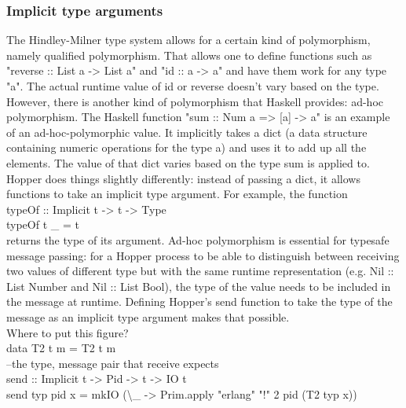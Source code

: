 \subsubsection{Implicit type arguments}
The Hindley-Milner type system allows for a certain kind of polymorphism, namely qualified polymorphism. That allows one to define functions such as "reverse :: List a -> List a" and "id :: a -> a" and have them work for any type "a". The actual runtime value of id or reverse doesn't vary based on the type. However, there is another kind of polymorphism that Haskell provides: ad-hoc polymorphism. The Haskell function "sum :: Num a => [a] -> a" is an example of an ad-hoc-polymorphic value. It implicitly takes a dict (a data structure containing numeric operations for the type a) and uses it to add up all the elements. The value of that dict varies based on the type sum is applied to. Hopper does things slightly differently: instead of passing a dict, it allows functions to take an implicit type argument. For example, the function \\
typeOf :: Implicit t -> t -> Type \\
typeOf t \_ = t \\
returns the type of its argument.
Ad-hoc polymorphism is essential for typesafe message passing: for a Hopper process to be able to distinguish between receiving two values of different type but with the same runtime representation (e.g. Nil :: List Number and Nil :: List Bool), the type of the value needs to be included in the message at runtime. Defining Hopper's send function to take the type of the message as an implicit type argument makes that possible. \\
Where to put this figure? \\
data T2 t m = T2 t m \\
--the type, message pair that receive expects \\
send :: Implicit t -> Pid -> t -> IO t \\
send typ pid x = mkIO (\textbackslash \_ -> Prim.apply "erlang" "!" 2 pid (T2 typ x)) \\

    

